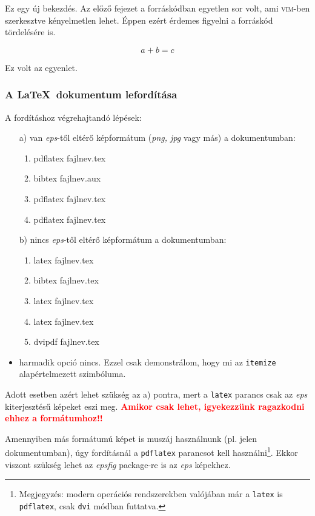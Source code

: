 \documentclass[a4paper, 12pt]{article}
\numberwithin{equation}{section}          %
\numberwithin{figure}{subsection}
\begin{document}
Ez egy új bekezdés. Az előző fejezet a forráskódban egyetlen sor volt, ami \textsc{vim}-ben 
szerkesztve kényelmetlen lehet. Éppen ezért érdemes figyelni a forráskód tördelésére is.

\begin{equation}
a+b=c
  \label{eq:eq1}
\end{equation}

Ez volt az egyenlet. 

\subsubsection{A \LaTeX\ dokumentum lefordítása}
A fordításhoz végrehajtandó lépések:

\begin{itemize}
  \item[a)] van \textit{eps}-től eltérő képformátum (\textit{png, jpg} vagy más) a dokumentumban:
  \begin{enumerate}
    \item pdflatex fajlnev.tex
    \item bibtex fajlnev.aux
    \item pdflatex fajlnev.tex
    \item pdflatex fajlnev.tex
  \end{enumerate}
  \item[b)] nincs \textit{eps}-től eltérő képformátum a dokumentumban:
  \begin{enumerate}
    \item latex fajlnev.tex
    \item bibtex fajlnev.tex
    \item latex fajlnev.tex
    \item latex fajlnev.tex
    \item dvipdf fajlnev.tex
  \end{enumerate}
  \item harmadik opció nincs. Ezzel csak demonstrálom, hogy mi az \texttt{itemize} alapértelmezett szimbóluma.
\end{itemize}

Adott esetben azért lehet szükség az a) pontra, mert a \texttt{latex} parancs csak az \emph{eps} 
kiterjesztésű képeket eszi meg. \textbf{\textcolor{red}{Amikor csak lehet, igyekezzünk ragazkodni 
ehhez a formátumhoz!!}} 

Amennyiben más formátumú képet is muszáj használnunk (pl. jelen dokumentumban), úgy fordításnál a 
\texttt{pdflatex} parancsot kell használni\footnote{Megjegyzés: modern operációs rendszerekben valójában már a 
\texttt{latex} is \texttt{pdflatex}, csak \texttt{dvi} módban futtatva.}. Ekkor viszont szükség lehet az 
\emph{epsfig} package-re is az \textit{eps} képekhez.
\end{document}
